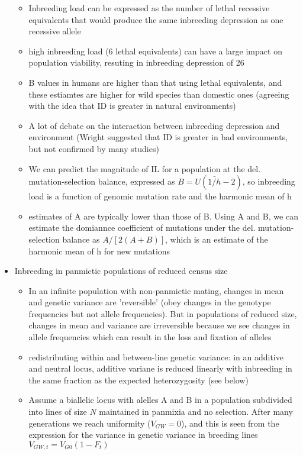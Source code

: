 \documentclass[12pt]{amsart}
\begin{document}
\begin{itemize}
\begin{itemize}
\item Inbreeding load can be expressed as the number of lethal recessive equivalents that would produce the same inbreeding depression as one recessive allele
\item high inbreeding load (6 lethal equivalents) can have a large impact on population viability, resuting in inbreeding depression of 26%
\item B values in humans are higher than that using lethal equivalents, and these estiamtes are higher for wild species than domestic ones (agreeing with the idea that ID is greater in natural environments) 
\item A lot of debate on the interaction between inbreeding depression and environment (Wright suggested that ID is greater in bad environments, but not confirmed by many studies)
\item We can predict the magnitude of IL for a population at the del. mutation-selection balance, expressed as $B = U(\bar{1/h}-2)$, so inbreeding load is a function of genomic mutation rate and the harmonic mean of h
\item estimates of A are typically lower than those of B. Using A and B, we can estimate the domiannce coefficient of mutations under the del. mutation-selection balance as $A/[2(A+B)]$, which is an estimate of the harmonic mean of h for new mutations 
\end{itemize}
\item Inbreeding in panmictic populations of reduced census size
\begin{itemize}
\item In an infinite population with non-panmictic mating, changes in mean and genetic variance are 'reversible' (obey changes in the genotype frequencies but not allele frequencies). But in populations of reduced size, changes in mean and variance are irreversible because we see changes in allele frequencies which can result in the loss and fixation of alleles 
\item redistributing within and between-line genetic variance: in an additive and neutral locus, additive variane is reduced linearly with inbreeding in the same fraction as the expected heterozygosity (see below)
\item Assume a biallelic locus with alelles A and B in a population subdivided into lines of size $N$ maintained in panmixia and no selection. After many generations we reach uniformity ($V_{GW} = 0$), and this is seen from the expression for the variance in genetic variance in breeding lines $V_{GW,t} = V_{G0}(1-F_t)$

\end{itemize}
\end{itemize}
\end{document}
